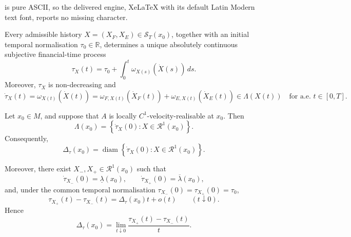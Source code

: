 \documentclass[10pt,a4paper]{amsart}
\begin{document}
is pure ASCII, so the delivered engine, XeLaTeX with its default Latin Modern text font, reports no missing character.
\begin{proposition}
\label{prop:temporal-process}

Every admissible history
\(X=(X_F,X_E)\in\mathcal S_T(x_0)\), together with an initial temporal
normalisation \(\tau_0\in\mathbb R\), determines a unique absolutely continuous
subjective financial-time process
\[
\tau_X(t)
=
\tau_0+
\int_0^t
\omega_{X(s)}\!\left(\dot X(s)\right)\,ds.
\]
Moreover, \(\tau_X\) is non-decreasing and
\begin{equation}
\dot\tau_X(t)
=
\omega_{X(t)}\!\left(\dot X(t)\right)
=
\omega_{F,X(t)}\!\left(\dot X_F(t)\right)
+
\omega_{E,X(t)}\!\left(\dot X_E(t)\right)
\in
\Lambda(X(t))
\quad
\text{for a.e. }t\in[0,T].
\label{eq:temporal-process-rate}
\end{equation}
\end{proposition}

\begin{theorem}
\label{thm:dispersion}

Let \(x_0\in M\), and suppose that \(A\) is locally
\(C^1\)-velocity-realisable at \(x_0\). Then
\begin{equation}
\Lambda(x_0)
=
\left\{
\dot\tau_X(0):
X\in\mathcal R^1(x_0)
\right\}.
\label{eq:representation-spectrum}
\end{equation}
Consequently,
\begin{equation}
\Delta_\tau(x_0)
=
\operatorname{diam}
\left\{
\dot\tau_X(0):
X\in\mathcal R^1(x_0)
\right\}.
\label{eq:representation-dispersion}
\end{equation}

Moreover, there exist
\(X_-,X_+\in\mathcal R^1(x_0)\) such that
\[
\dot\tau_{X_-}(0)
=
\underline\lambda(x_0),
\qquad
\dot\tau_{X_+}(0)
=
\overline\lambda(x_0),
\]
and, under the common temporal normalisation
\(\tau_{X_-}(0)=\tau_{X_+}(0)=\tau_0\),
\begin{equation}
\tau_{X_+}(t)-\tau_{X_-}(t)
=
\Delta_\tau(x_0)t+o(t)
\qquad
(t\downarrow0).
\label{eq:dispersion-expansion}
\end{equation}
Hence
\[
\Delta_\tau(x_0)
=
\lim_{t\downarrow0}
\frac{
\tau_{X_+}(t)-\tau_{X_-}(t)
}{t}.
\]
\end{theorem}
\end{document}
